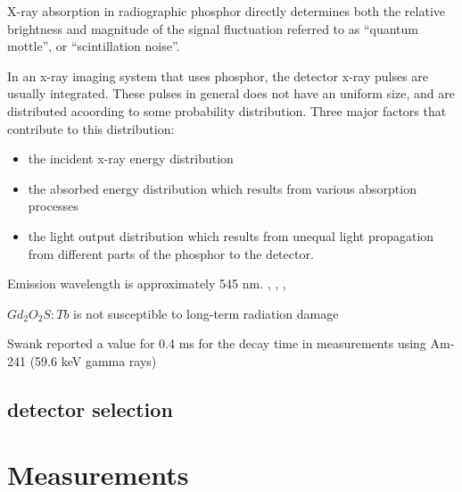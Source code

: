 X-ray absorption in radiographic phosphor directly determines both the relative brightness and magnitude of the signal fluctuation referred to as ``quantum mottle'', or ``scintillation noise''.\cite{swank1973}

In an x-ray imaging system that uses phosphor, the detector x-ray pulses are usually integrated.  These pulses in general does not have an uniform size, and are distributed acoording to some probability distribution.  Three major factors that contribute to this distribution:

\begin{itemize}
\item the incident x-ray energy distribution
\item the absorbed energy distribution which results from various absorption processes
\item the light output distribution which results from unequal light propagation from different parts of the phosphor to the detector.
\end{itemize}


Emission wavelength is approximately 545 nm. \cite{Berzins1983}, \cite{Moy1993}, \cite{shepherd1995}, \cite{blasse1994}

$Gd_2O_2S:Tb$ is not susceptible to long-term radiation damage \cite{Antonuk1990}

Swank reported a value for 0.4 ms for the decay time in measurements using Am-241 (59.6 keV gamma rays) \cite{Swank1974}

\subsection{detector selection}



\section{Measurements}

